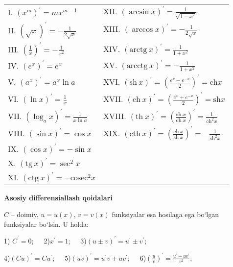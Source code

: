 \begin{tabular}{l l}

I. $(x^{m})^{\prime}=mx^{m-1}$&XII. $(\arcsin{x})^{\prime}=\frac{1}{\sqrt{1-x^{2}}}$\\

II. $(\sqrt{x})^{\prime}=-\frac{1}{2\sqrt{x}}$& XIII. $(\arccos{x})^\prime=-\frac{1}{2\sqrt{x}}$\\

III. $\left(\frac{1}{x}\right)^{\prime}=-\frac{1}{x^{2}}$& XIV. $(\mbox{arctg}\ x)^{\prime}=\frac{1}{1+x^{2}}$\\

IV. $(e^{x})^{\prime}=e^{x}$& XV. $(\mbox{arcctg}\ x)^{\prime}=-\frac{1}{1+x^{2}}$\\

V. $(a^{x})^{\prime}=a^{x}\ln{a}$&XVI. $(\mbox{sh}\ x)^{\prime}=\left(\frac{e^{x}-e^{-x}}{2}\right)^{\prime}=\mbox{ch}x$ \\

VI. $(\ln{x})^{\prime}=\frac{1}{x}$&XVII. $(\mbox{ch}\ x)^{\prime}=\left(\frac{e^{x}+e^{-x}}{2}\right)^{\prime}=\mbox{sh}x$ \\

VII. $(\log_{a}x)^{\prime}=\frac{1}{x\ln{a}}$&XVIII. $(\mbox{th}\ x)^{\prime}=\left(\frac{\mbox{sh}\ x}{\mbox{ch}\ x}\right)^{\prime}=\frac{1}{\mbox{ch}^{2}x}$ \\

VIII. $(\sin{x})^{\prime}=\cos{x}$& XIX. $(\mbox{cth}\ x)^{\prime}=\left(\frac{\mbox{ch}\ x}{\mbox{sh}\ x}\right)^{\prime}=-\frac{1}{\mbox{sh}^{2}x}$ \\

IX. $(\cos{x})^{\prime}=-\sin{x}$& \\

X. $(\mbox{tg}\ x)^{\prime}=\sec^{2}{x}$& \\

XI. $(\mbox{ctg}\ x)^{\prime}=-\mbox{cosec}^{2}x$& \\

\end{tabular}

\textbf{Asosiy differensiallash qoidalari}

$C$ -- doimiy, $u=u(x)$, $v=v(x)$ funksiyalar esa hosilaga ega bo`lgan funksiyalar bo`lsin. U holda:

1) $C^{\prime}=0$;\ \ \ 2)$x^\prime=1$;\ \ \  3)$(u\pm v)^{\prime}=u^\prime\pm v^{\prime}$;\ \ \

 4)$(Cu)^{\prime}=Cu^\prime$;\ \ \ 5)$(uv)^\prime=u^\prime v+uv^\prime$;\ \ \ 6)$\left(\frac{u}{v}\right)^\prime=\frac{u^\prime-uv^\prime}{v^{2}}$;
 
